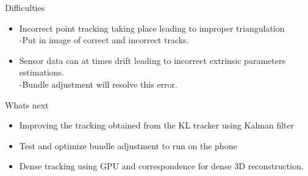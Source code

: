 \documentclass{beamer}
\begin{document}
\begin{frame}{Difficulties}{}
	\begin{itemize}
		\item Incorrect point tracking taking place leading to improper triangulation \\-Put in image of correct and incorrect tracks.
    \vspace{5mm}
		\item Sensor data can at times drift leading to incorrect extrinsic parameters estimations. \\-Bundle adjustment will resolve this error.
	\end{itemize}
\end{frame}

\begin{frame}{Whats next}{}
	\begin{itemize}
		\item Improving the tracking obtained from the KL tracker using Kalman filter
		\item Test and optimize bundle adjustment to run on the phone
		\item Dense tracking using GPU and correspondence for dense 3D reconstruction.
	\end{itemize}
\end{frame}

\end{document}
